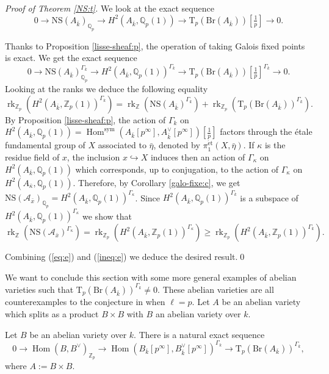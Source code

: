 \documentclass[11pt]{amsart}
\newcommand{\spa}{\medskip}
\newcommand{\Z}{\mathbb{Z}}
\newcommand{\kbar}{{\bar{k}}}
\newcommand{\Zp}{{\mathbb{Z}_{p}}}
\newcommand{\Qp}{{\mathbb{Q}_{p}}}
\newcommand{\sym}{{\mathrm{sym}}}
\newcommand{\calA}{\mathcal{A}}
\DeclareMathOperator{\Hom}{Hom}
\DeclareMathOperator{\rk}{rk}
\newcommand{\et}{\mathrm{\acute{e}t}}
\newcommand{\Br}{\mathrm{Br}}
\newcommand{\NS}{\mathrm{NS}}
\newcommand{\Tp}{\mathrm{T}_p}
\begin{document}
\subsection{}\textit{Proof of Theorem \ref{NS:t}. }We look at the exact sequence
$$0\to\NS(A_{\kbar})_{\Qp}\to H^2(A_{\kbar},\Qp(1))\to \Tp(\Br(A_{\kbar}))[\tfrac{1}{p}]\to 0.$$

Thanks to Proposition \ref{lisse-sheaf:p}, the operation of taking Galois fixed points is exact. We get the exact sequence
$$0\to\NS(A_{\kbar})_{\Qp}^{\Gamma_k}\to H^2(A_{\kbar},\Qp(1))^{\Gamma_k}\to \Tp(\Br(A_{\kbar}))[\tfrac{1}{p}]^{\Gamma_k}\to 0.$$
Looking at the ranks we deduce the following equality
\begin{equation}\label{eq:e}
\rk_\Zp(H^2(A_{\kbar},\Zp(1))^{\Gamma_k})=\rk_\Z(\NS(A_{\kbar})^{\Gamma_k})+\rk_\Zp(\Tp(\Br(A_{\kbar}))^{\Gamma_k}).
\end{equation}
By Proposition \ref{lisse-sheaf:p}, the action of $\Gamma_k$ on $H^2(A_{\kbar},\Qp(1))=\Hom^\sym(A_\kbar[p^\infty],A^\vee_\kbar[p^\infty])[\tfrac{1}{p}]$ factors through the étale fundamental group of $X$ associated to $\bar{\eta}$, denoted by $\pi_1^{\et}(X,\bar{\eta})$. If $\kappa$ is the residue field of $x$, the inclusion $x\hookrightarrow X$ induces then an action of $\Gamma_\kappa$ on $H^2(A_{\kbar},\Qp(1))$ which corresponds, up to conjugation, to the action of $\Gamma_\kappa$ on $H^2(A_{\bar{\kappa}},\Qp(1))$. Therefore, by Corollary \ref{galo-fixe:c}, we get $\NS(\calA_{\bar{x}})_\Qp=H^2(A_{\kbar},\Qp(1))^{\Gamma_\kappa}$. Since $H^2(A_{\kbar},\Qp(1))^{\Gamma_k}$ is a subspace of $H^2(A_{\kbar},\Qp(1))^{\Gamma_\kappa}$ we show that
\begin{equation}\label{ineq:e}
	\rk_\Z(\NS(\calA_{\bar{x}})^{\Gamma_\kappa})=\rk_\Zp(H^2(A_{\kbar},\Zp(1))^{\Gamma_\kappa})\geq \rk_\Zp(H^2(A_{\kbar},\Zp(1))^{\Gamma_k}).
\end{equation}

Combining (\ref{eq:e}) and (\ref{ineq:e}) we deduce the desired result.\qed

\spa

We want to conclude this section with some more general examples of abelian varieties such that $ \Tp(\Br(A_{\kbar}))^{\Gamma_k}\neq 0$. These abelian varieties are all counterexamples to the conjecture in \cite[§7.3.1]{Ulm14} when $\ell=p$. Let $A$ be an abelian variety which splits as a product $B\times B$ with $B$ an abelian variety over $k$.
\begin{prop}\label{counter:p}
		Let $B$ be an abelian variety over $k$. There is a natural exact sequence $$0\to \Hom(B,B^\vee)_\Zp\to \Hom(B_\kbar[p^\infty],B_\kbar^\vee[p^\infty])^{\Gamma_k}\to \Tp(\Br(A_{\kbar}))^{\Gamma_k},$$ where $A:=B\times B$.
			
	
\end{prop}
\end{document}
